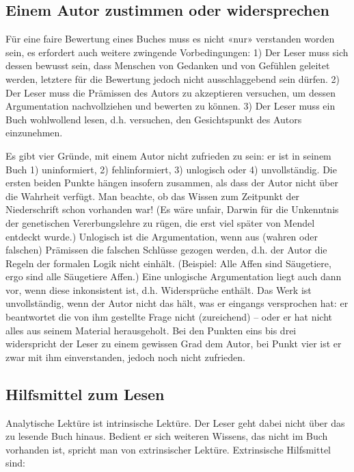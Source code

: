 \documentclass[a4paper,11pt]{scrartcl}
\begin{document}
\subsection{Einem Autor zustimmen oder widersprechen}

Für eine faire Bewertung eines Buches muss es nicht «nur» verstanden worden sein, es erfordert auch weitere zwingende Vorbedingungen: 1) Der Leser muss sich dessen bewusst sein, dass Menschen von Gedanken und von Gefühlen geleitet werden, letztere für die Bewertung jedoch nicht ausschlaggebend sein dürfen. 2) Der Leser muss die Prämissen des Autors zu akzeptieren versuchen, um dessen Argumentation nachvollziehen und bewerten zu können. 3) Der Leser muss ein Buch wohlwollend lesen, d.h. versuchen, den Gesichtspunkt des Autors einzunehmen.

Es gibt vier Gründe, mit einem Autor nicht zufrieden zu sein: er ist in seinem Buch 1) uninformiert, 2) fehlinformiert, 3) unlogisch oder 4) unvollständig. Die ersten beiden Punkte hängen insofern zusammen, als dass der Autor nicht über die Wahrheit verfügt. Man beachte, ob das Wissen zum Zeitpunkt der Niederschrift schon vorhanden war! (Es wäre unfair, Darwin für die Unkenntnis der genetischen Vererbungslehre zu rügen, die erst viel später von Mendel entdeckt wurde.) Unlogisch ist die Argumentation, wenn aus (wahren oder falschen) Prämissen die falschen Schlüsse gezogen werden, d.h. der Autor die Regeln der formalen Logik nicht einhält. (Beispiel: Alle Affen sind Säugetiere, ergo sind alle Säugetiere Affen.) Eine unlogische Argumentation liegt auch dann vor, wenn diese inkonsistent ist, d.h. Widersprüche enthält. Das Werk ist unvollständig, wenn der Autor nicht das hält, was er eingangs versprochen hat: er beantwortet die von ihm gestellte Frage nicht (zureichend) – oder er hat nicht alles aus seinem Material herausgeholt. Bei den Punkten eins bis drei widerspricht der Leser zu einem gewissen Grad dem Autor, bei Punkt vier ist er zwar mit ihm einverstanden, jedoch noch nicht zufrieden.

\subsection{Hilfsmittel zum Lesen}

Analytische Lektüre ist intrinsische Lektüre. Der Leser geht dabei nicht über das zu lesende Buch hinaus. Bedient er sich weiteren Wissens, das nicht im Buch vorhanden ist, spricht man von extrinsischer Lektüre. Extrinsische Hilfsmittel sind:
\end{document}
